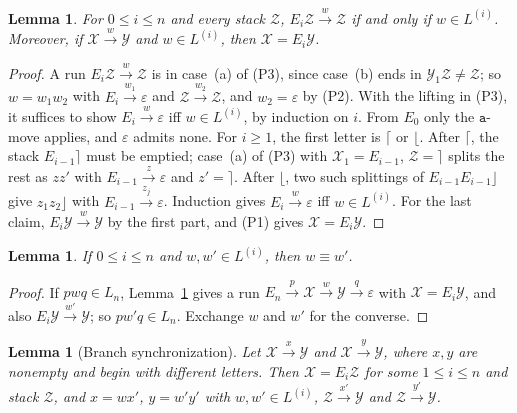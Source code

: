 \documentclass[11pt]{article}
\numberwithin{equation}{section}
\theoremstyle{plain}
\newtheorem{lemma}[theorem]{Lemma}
\theoremstyle{definition}
\theoremstyle{remark}
\newcommand{\eps}{\varepsilon}
\theoremstyle{plain}
\begin{document}
\begin{lemma}\label{lem:app-br-recognition-br5}
For $0\le i\le n$ and every stack $\mathcal Z$,
$E_i\mathcal Z\xrightarrow{w}\mathcal Z$ if and only if $w\in L^{(i)}$. Moreover, if
$\mathcal X\xrightarrow{w}\mathcal Y$ and $w\in L^{(i)}$, then $\mathcal X=E_i\mathcal Y$.
\end{lemma}

\begin{proof}
A run $E_i\mathcal Z\xrightarrow{w}\mathcal Z$ is in case~(a) of (P3), since case~(b)
ends in $\mathcal Y_1\mathcal Z\ne\mathcal Z$; so $w=w_1w_2$ with
$E_i\xrightarrow{w_1}\eps$ and $\mathcal Z\xrightarrow{w_2}\mathcal Z$, and
$w_2=\eps$ by (P2). With the lifting in (P3), it suffices to show
$E_i\xrightarrow{w}\eps$ iff $w\in L^{(i)}$, by induction on $i$. From
$E_0$ only the $\mathtt a$-move applies, and $\eps$ admits none. For
$i\ge1$, the first letter is $\lceil$ or $\lfloor$. After $\lceil$, the
stack $E_{i-1}\rceil$ must be emptied; case~(a) of (P3) with
$\mathcal X_1=E_{i-1}$, $\mathcal Z=\rceil$ splits the rest as $zz'$ with
$E_{i-1}\xrightarrow{z}\eps$ and $z'=\rceil$. After $\lfloor$, two such
splittings of $E_{i-1}E_{i-1}\rfloor$ give $z_1z_2\rfloor$ with
$E_{i-1}\xrightarrow{z_j}\eps$. Induction gives
$E_i\xrightarrow{w}\eps$ iff $w\in L^{(i)}$. For the last claim,
$E_i\mathcal Y\xrightarrow{w}\mathcal Y$ by the first part, and (P1) gives
$\mathcal X=E_i\mathcal Y$.
\end{proof}

\begin{lemma}\label{lem:app-br-exchange-br5}
If $0\le i\le n$ and $w,w'\in L^{(i)}$, then $w\equiv w'$.
\end{lemma}

\begin{proof}
If $pwq\in L_n$, Lemma~\ref{lem:app-br-recognition-br5} gives a run
$E_n\xrightarrow{p}\mathcal X\xrightarrow{w}\mathcal Y\xrightarrow{q}\eps$ with
$\mathcal X=E_i\mathcal Y$, and also $E_i\mathcal Y\xrightarrow{w'}\mathcal Y$; so
$pw'q\in L_n$. Exchange $w$ and $w'$ for the converse.
\end{proof}

\begin{lemma}[Branch synchronization]\label{lem:app-br-branch-br5}
Let $\mathcal X\xrightarrow{x}\mathcal Y$ and $\mathcal X\xrightarrow{y}\mathcal Y$, where
$x,y$ are nonempty and begin with different letters. Then
$\mathcal X=E_i\mathcal Z$ for some $1\le i\le n$ and stack $\mathcal Z$, and $x=wx'$,
$y=w'y'$ with $w,w'\in L^{(i)}$, $\mathcal Z\xrightarrow{x'}\mathcal Y$ and
$\mathcal Z\xrightarrow{y'}\mathcal Y$.
\end{lemma}
\end{document}
